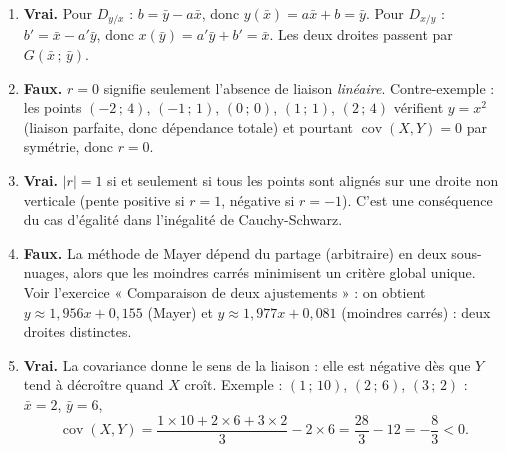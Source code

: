 \documentclass[11pt]{article}
\begin{document}
\begin{corrige}
\begin{enumerate}
\item \textbf{Vrai.} Pour $D_{y/x}$ : $b=\bar{y}-a\bar{x}$, donc $y(\bar{x})=a\bar{x}+b=\bar{y}$. Pour $D_{x/y}$ : $b'=\bar{x}-a'\bar{y}$, donc $x(\bar{y})=a'\bar{y}+b'=\bar{x}$. Les deux droites passent par $G(\bar{x}\,;\,\bar{y})$.
\item \textbf{Faux.} $r=0$ signifie seulement l'absence de liaison \emph{linéaire}. Contre-exemple : les points $(-2\,;\,4)$, $(-1\,;\,1)$, $(0\,;\,0)$, $(1\,;\,1)$, $(2\,;\,4)$ vérifient $y=x^2$ (liaison parfaite, donc dépendance totale) et pourtant $\operatorname{cov}(X,Y)=0$ par symétrie, donc $r=0$.
\item \textbf{Vrai.} $|r|=1$ si et seulement si tous les points sont alignés sur une droite non verticale (pente positive si $r=1$, négative si $r=-1$). C'est une conséquence du cas d'égalité dans l'inégalité de Cauchy-Schwarz.
\item \textbf{Faux.} La méthode de Mayer dépend du partage (arbitraire) en deux sous-nuages, alors que les moindres carrés minimisent un critère global unique. Voir l'exercice « Comparaison de deux ajustements » : on obtient $y\approx1{,}956x+0{,}155$ (Mayer) et $y\approx1{,}977x+0{,}081$ (moindres carrés) : deux droites distinctes.
\item \textbf{Vrai.} La covariance donne le sens de la liaison : elle est négative dès que $Y$ tend à décroître quand $X$ croît. Exemple : $(1\,;\,10)$, $(2\,;\,6)$, $(3\,;\,2)$ : $\bar{x}=2$, $\bar{y}=6$,
\[
\operatorname{cov}(X,Y)=\frac{1\times10+2\times6+3\times2}{3}-2\times6=\frac{28}{3}-12=-\frac{8}{3}<0.
\]
\end{enumerate}
\end{corrige}
\end{document}
